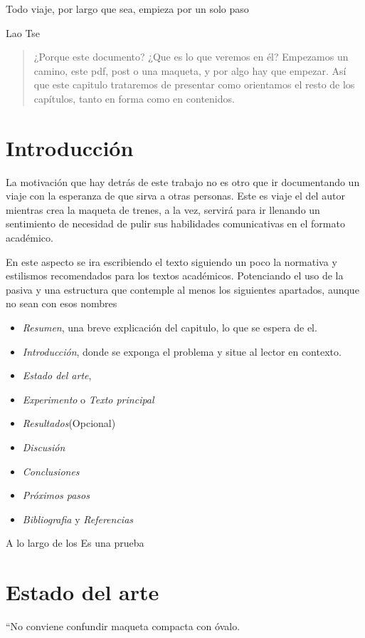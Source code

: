 
\epigraph{Todo viaje, por largo que sea, empieza por un solo paso}{Lao Tse}

\begin{abstract}
¿Porque este documento? ¿Que es lo que veremos en él? Empezamos un camino, este pdf, post o una maqueta, y por algo hay que empezar. Así que este capitulo trataremos de presentar como orientamos el resto de los capítulos, tanto en forma como en contenidos.
\end{abstract}

\section{Introducción}
La motivación que hay detrás de este trabajo no es otro que ir documentando un viaje con la esperanza de que sirva a otras personas. Este es viaje el del autor mientras crea la maqueta de trenes, a la vez, servirá para ir llenando un sentimiento de necesidad de pulir sus habilidades comunicativas en el formato académico.

En este aspecto se ira escribiendo el texto siguiendo un poco la normativa y estilismos  recomendados para los textos académicos. Potenciando el uso de la pasiva y una estructura que contemple al menos los siguientes apartados, aunque no sean con esos nombres
\begin{itemize}
	\item \textit{Resumen}, una breve explicación del capitulo, lo que se espera de el.
	\item \textit{Introducción}, donde se exponga el problema y situe al lector en contexto.
	\item \textit{Estado del arte}, 
	\item \textit{Experimento} o \textit{Texto principal}
	\item \textit{Resultados}(Opcional) 
	\item \textit{Discusión}
	\item \textit{Conclusiones}
	\item \textit{Próximos pasos}
	\item \textit{Bibliografia} y \textit{Referencias}
\end{itemize}
A lo largo de los   
\cite{acemoglu2000} Es una prueba

\section{Estado del arte}
``No conviene confundir maqueta compacta con óvalo.

